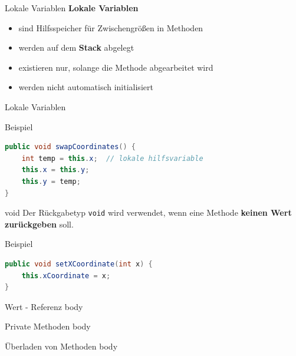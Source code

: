 \documentclass[18pt]{beamer}
\begin{document}
\begin{frame}{Lokale Variablen}
    \textbf{Lokale Variablen}
    \begin{itemize}
        \item sind Hilfsspeicher für Zwischengrößen in Methoden
        \item werden auf dem \textbf{Stack} abgelegt
        \item existieren nur, solange die Methode abgearbeitet wird
        \item \alert{werden nicht automatisch initialisiert}
    \end{itemize}
\end{frame}

\begin{frame}[fragile]{Lokale Variablen}
    \begin{exampleblock}{Beispiel}
        \begin{lstlisting}[language=Java]
public void swapCoordinates() {
    int temp = this.x;  // lokale hilfsvariable
    this.x = this.y;
    this.y = temp;
}
        \end{lstlisting}
    \end{exampleblock}

\end{frame}

\begin{frame}[fragile]{void}
    Der Rückgabetyp \texttt{void} wird verwendet, wenn eine Methode \textbf{keinen Wert zurückgeben} soll.

    \begin{exampleblock}{Beispiel}
        \begin{lstlisting}[language=Java]
public void setXCoordinate(int x) {
    this.xCoordinate = x;
}
        \end{lstlisting}
    \end{exampleblock}



\end{frame}

\begin{frame}{Wert - Referenz}
    body
\end{frame}

\begin{frame}{Private Methoden}
    body
\end{frame}

\begin{frame}{Überladen von Methoden}
    body
\end{frame}
\end{document}
